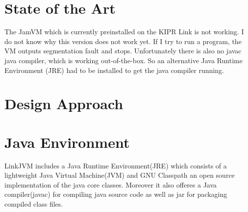 \documentclass{juniorjournal}
\begin{document}
\section{State of the Art}
The JamVM which is currently preinstalled on the KIPR Link is not working.
I do not know why this version does not work yet.
If I try to run a program, the VM outputs \frqq segmentation fault \flqq and stops.
Unfortunately there is also no javac java compiler, which is working out-of-the-box.
So an alternative Java Runtime Environment (JRE) had to be installed to get the java compiler running.

\section{Design Approach}

\section{Java Environment}
LinkJVM includes a Java Runtime Environment(JRE) which consists of a lightweight Java Virtual Machine(JVM) and GNU Classpath an open source implementation of the java core classes.
Moreover it also offeres a Java compiler(javac) for compiling java source code as well as jar for packaging compiled class files.

\begin{thebibliography}{500} %

\end{thebibliography}
\end{document}
